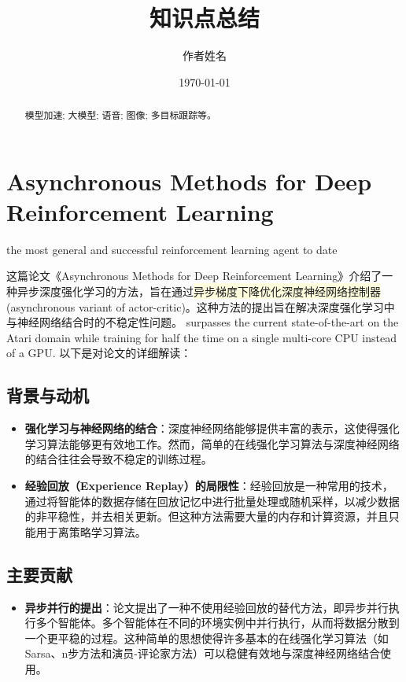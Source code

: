 \documentclass[twocolumn, 10pt]{article} %
\begin{document}
\title{知识点总结}
\author{作者姓名}
\date{\today}
\maketitle
\begin{abstract}
    模型加速; 大模型; 语音; 图像; 多目标跟踪等。
\end{abstract}



\section{Asynchronous Methods for Deep Reinforcement Learning}
the most general
and successful reinforcement learning agent to date


这篇论文《Asynchronous Methods for Deep Reinforcement Learning》介绍了一种异步深度强化学习的方法，旨在通过\colorbox{lightyellow}{异步梯度下降优化深度神经网络控制器} (asynchronous variant of actor-critic)。这种方法的提出旨在解决深度强化学习中与神经网络结合时的不稳定性问题。 surpasses
the current state-of-the-art on the Atari domain
while training for half the time on a single
multi-core CPU instead of a GPU. 以下是对论文的详细解读：

\subsection{背景与动机}
\begin{itemize}
    \item \textbf{强化学习与神经网络的结合}：深度神经网络能够提供丰富的表示，这使得强化学习算法能够更有效地工作。然而，简单的在线强化学习算法与深度神经网络的结合往往会导致不稳定的训练过程。
    \item \textbf{经验回放（Experience Replay）的局限性}：经验回放是一种常用的技术，通过将智能体的数据存储在回放记忆中进行批量处理或随机采样，以减少数据的非平稳性，并去相关更新。但这种方法需要大量的内存和计算资源，并且只能用于离策略学习算法。
\end{itemize}

\subsection{主要贡献}
\begin{itemize}
    \item \textbf{异步并行的提出}：论文提出了一种不使用经验回放的替代方法，即异步并行执行多个智能体。多个智能体在不同的环境实例中并行执行，从而将数据分散到一个更平稳的过程。这种简单的思想使得许多基本的在线强化学习算法（如Sarsa、n步方法和演员-评论家方法）可以稳健有效地与深度神经网络结合使用。
\end{itemize}
\end{document}

